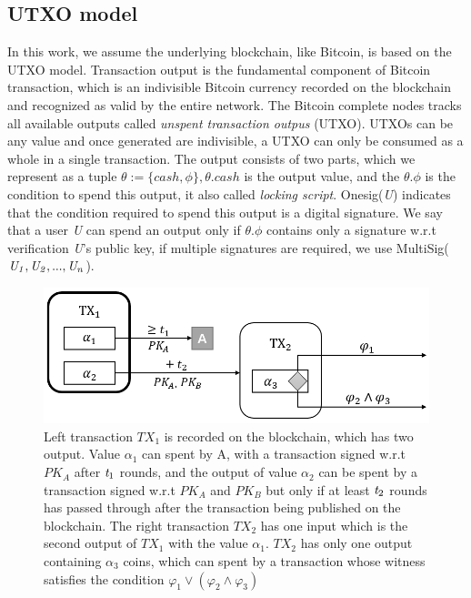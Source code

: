 \documentclass[conference]{IEEEtran}
\begin{document}
\subsection{UTXO model}

In this work, we assume the underlying blockchain, like Bitcoin, is based on the UTXO model. Transaction output is the fundamental 
component of Bitcoin transaction, which is an indivisible Bitcoin currency recorded on the blockchain and recognized as valid by 
the entire network. The Bitcoin complete nodes tracks all available outputs called \emph{unspent transaction outpus} (UTXO). 
UTXOs can be any value and once generated are indivisible, a UTXO can only be consumed as a whole in a single transaction. 
The output consists of two parts, which we represent as a tuple $\theta :=\{cash,\phi\}, \theta.cash$ is the output value,
 and the $\theta.\phi$ is the condition to spend this output, it also called \emph{locking script}. Onesig(\emph{U}) indicates 
 that the condition required to spend this output is a digital signature. We say that a user \emph{U} can spend an output only if
 $\theta.\phi$ contains only a signature w.r.t verification  \emph{U}'s public key, if multiple signatures are required, we use 
 MultiSig($\it U_1,U_2,...,U_n$).

\begin{figure}[t]
    \centering
    \includegraphics[scale=0.5]{fig2.png}
    \caption{Left transaction $TX_1$ is recorded on the blockchain, which has two output. Value $\alpha_1$ can spent by A, with a 
    transaction signed w.r.t $PK_A$ after $\emph{t}_1$ rounds, and the output of value $\alpha_2$ can be spent by a transaction signed w.r.t 
    $PK_A$ and $PK_B$ but only if at least $\emph{t}_2$ rounds has passed through after the transaction being published on the blockchain. The
    right transaction $TX_2$ has one input which is the second output of $TX_1$ with the value $\alpha_1$. $TX_2$ has only one
    output containing $\alpha_3$ coins, which can spent by a transaction whose witness satisfies the condition $\varphi_1 \vee (\varphi_2 
    \wedge \varphi_3)$}
\end{figure}
\end{document}
